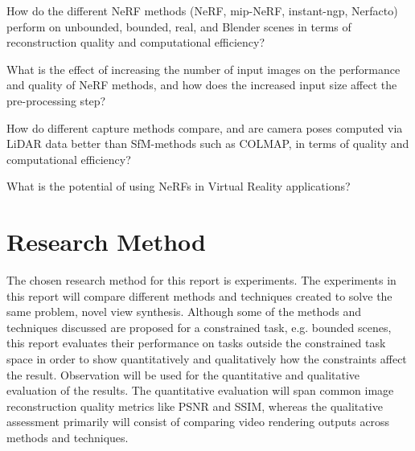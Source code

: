 
\begin{description}[leftmargin=!,labelwidth=\widthof{RQ 1:}]
\item[\textbf{RQ 1:}]
How do the different NeRF methods (NeRF, mip-NeRF, instant-ngp, Nerfacto) perform on unbounded, bounded, real, and Blender scenes in terms of reconstruction quality and computational efficiency?
\item[\textbf{RQ 2:}]
What is the effect of increasing the number of input images on the performance and quality of NeRF methods, and how does the increased input size affect the pre-processing step?
\item[\textbf{RQ 3:}]
How do different capture methods compare, and are camera poses computed via LiDAR data better than SfM-methods such as COLMAP, in terms of quality and computational efficiency?
\item[\textbf{RQ 4:}]
What is the potential of using NeRFs in Virtual Reality applications?
\end{description}


\section{Research Method}
The chosen research method for this report is experiments. The experiments in this report will compare different methods and techniques created to solve the same problem, novel view synthesis. Although some of the methods and techniques discussed are proposed for a constrained task, e.g. bounded scenes, this report evaluates their performance on tasks outside the constrained task space in order to show quantitatively and qualitatively how the constraints affect the result. Observation will be used for the quantitative and qualitative evaluation of the results. The quantitative evaluation will span common image reconstruction quality metrics like PSNR and SSIM, whereas the qualitative assessment primarily will consist of comparing video rendering outputs across methods and techniques.


